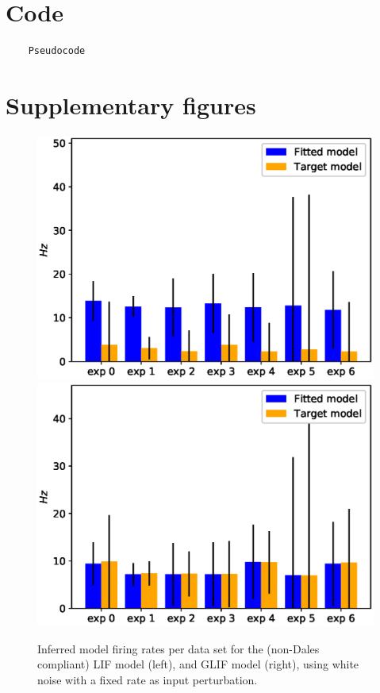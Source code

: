 \documentclass[mphil,deptreport,ianc]{infthesis} %
\begin{document}
\chapter{Code}

\begin{verbatim}
    Pseudocode
\end{verbatim}

\appendix
\label{further_results}

\chapter{Supplementary figures}

\begin{figure}
    \centering
    \includegraphics[width=0.49\columnwidth]{figures/sleep/approx_rate_across_exp_LIF_no_cell_types_frd_vs_fitted.eps}
    \includegraphics[width=0.49\columnwidth]{figures/sleep/approx_rate_across_exp_GLIF_no_cell_types_frd_vs_fitted.eps}
    \caption{Inferred model firing rates per data set for the (non-Dales compliant) LIF model (left), and GLIF model (right), using white noise with a fixed rate as input perturbation.}
    \label{fig:approx_rates_sleep_exps_LIF}
\end{figure}


% 
% 
% 
\end{document}
